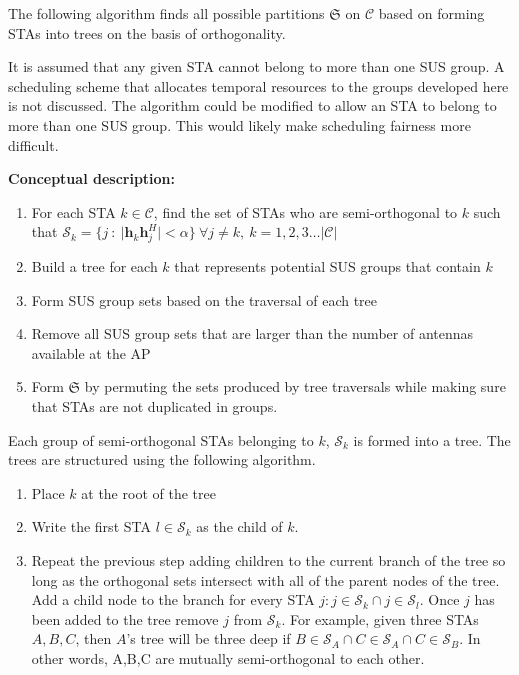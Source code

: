The following algorithm finds all possible partitions $\mathfrak{S}$ on $\mathcal{C}$ based on forming STAs into trees on the basis of orthogonality.

It is assumed that any given STA cannot belong to more than one SUS group. A scheduling scheme that allocates temporal resources to the groups developed here is not discussed. The algorithm could be modified to allow an STA to belong to more than one SUS group. This would likely make scheduling fairness more difficult.

\textbf{Conceptual description:}
\begin{enumerate}
    \item For each STA $k \in \mathcal{C}$, find the set of STAs who are semi-orthogonal to $k$ such that $\mathcal{S}_k = \lbrace j\ : \ \vert \textbf{h}_k \textbf{h}_j^H \vert < \alpha \rbrace \ \forall j \neq k,\ k = 1,2,3\ldots\vert\mathcal{C}\vert$
    \item Build a tree for each $k$ that represents potential SUS groups that contain $k$
    \item Form SUS group sets based on the traversal of each tree
    \item Remove all SUS group sets that are larger than the number of antennas available at the AP
    \item Form $\mathfrak{S}$ by permuting the sets produced by tree traversals while making sure that STAs are not duplicated in groups.
\end{enumerate}

Each group of semi-orthogonal STAs belonging to $k$, $\mathcal{S}_k$ is formed into a tree. The trees are structured using the following algorithm.
\begin{enumerate}
    \item Place $k$ at the root of the tree
    \item Write the first STA $l \in \mathcal{S}_k$ as the child of $k$.
    \item Repeat the previous step adding children to the current branch of the tree so long as the orthogonal sets intersect with all of the parent nodes of the tree. Add a child node to the branch for every STA $j : j \in \mathcal{S}_k \cap j \in \mathcal{S}_l$. Once $j$ has been added to the tree remove $j$ from $\mathcal{S}_k$.
    For example, given three STAs $A,B,C$, then $A$'s tree will be three deep if $B\in\mathcal{S}_A \cap C\in \mathcal{S}_A \cap C \in \mathcal{S}_B$. In other words, A,B,C are mutually semi-orthogonal to each other.
\end{enumerate}

